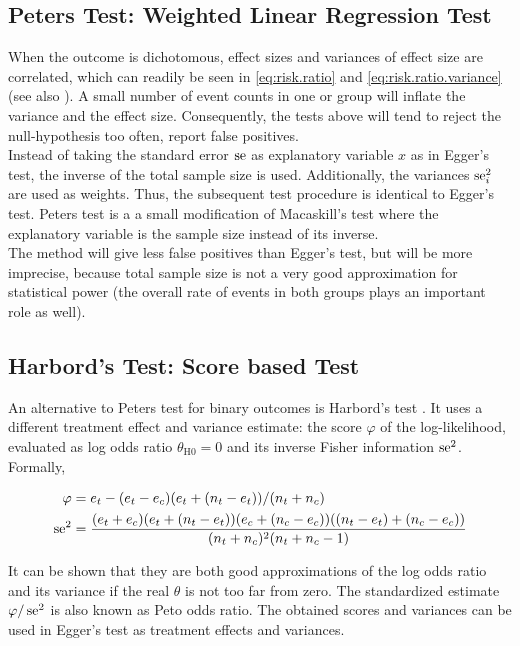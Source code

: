\documentclass[11pt,a4paper,twoside]{book}\usepackage[]{graphicx}\usepackage[]{color}
\begin{document}
\subsection{Peters Test: Weighted Linear Regression Test} \label{sec:Peter}
When the outcome is dichotomous, effect sizes and variances of effect size are correlated, which can readily be seen in \eqref{eq:risk.ratio} and \eqref{eq:risk.ratio.variance} (see also \cite[p. 120]{meta.w.R}). A small number of event counts in one or group will inflate the variance and the effect size. Consequently, the tests above will tend to reject the null-hypothesis too often, \ie report false positives.\\ 
Instead of taking the standard error $\operatorname{se}$ as explanatory variable $x$ as in Egger's test, the inverse of the total sample size is used. Additionally, the variances $\operatorname{se}_i^2$ are used as weights. Thus, the subsequent test procedure is identical to Egger's test. Peters test is a a small modification of Macaskill's test where the explanatory variable is the sample size instead of its inverse. \\
The method will give less false positives than Egger's test, but will be more imprecise, because total sample size is not a very good approximation for statistical power (the overall rate of events in both groups plays an important role as well).



\subsection{Harbord's Test: Score based Test} \label{sec:Harbord}
An alternative to Peters test for binary outcomes is Harbord's test \citep{Harbord}.
It uses a different treatment effect and variance estimate: the score $\varphi$ of the log-likelihood, evaluated as log odds ratio $\theta_\textrm{H0} = 0$ and its inverse Fisher information $\operatorname{se}^2$. Formally,

\begin{align}
\varphi &= e_t - (e_t - e_c)(e_t + (n_t - e_t))/(n_t + n_c) \nonumber \\
 \operatorname{se}^2 &= \frac{(e_t + e_c)(e_t + (n_t - e_t))(e_c + (n_c - e_c))((n_t - e_t) + (n_c - e_c))}{(n_t + n_c)^2(n_t + n_c - 1)} \nonumber
\end{align}

It can be shown that they are both good approximations of the log odds ratio and its variance if the real $\theta$ is not too far from zero. The standardized estimate $\varphi/\operatorname{se}^2$ is also known as Peto odds ratio. The obtained scores and variances can be used in Egger's test as treatment effects and variances.
\end{document}
